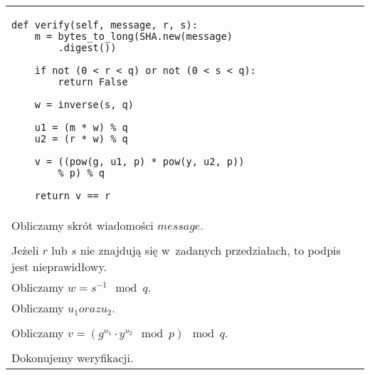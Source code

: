 \documentclass{article}
\begin{document}
        \noindent\begin{table}[ht!]
            \begin{tabular}{lr}
                \begin{minipage}[t]{0.45\textwidth}
                    \begin{verbatim}
def verify(self, message, r, s):
    m = bytes_to_long(SHA.new(message)
        .digest())

    if not (0 < r < q) or not (0 < s < q):
        return False

    w = inverse(s, q)
    
    u1 = (m * w) % q
    u2 = (r * w) % q
    
    v = ((pow(g, u1, p) * pow(y, u2, p)) 
        % p) % q

    return v == r
                    \end{verbatim}
                \end{minipage}
                
                &
        
                \begin{minipage}[t]{0.45\textwidth}                    
                    \noindent \\ Obliczamy skrót wiadomości $message$. \\ \\
                    
                    \noindent Jeżeli $r$ lub $s$ nie znajdują się w~zadanych przedziałach, to podpis jest nieprawidłowy. \\
                    
                    \noindent Obliczamy $w = s^{-1} \mod q$. \\
                    
                    \noindent Obliczamy $u_{1} oraz u_{2}$. \\ \\
                    
                    \noindent Obliczamy $v = (g^{u_{1}} \cdot y^{u_{2}} \mod p) \mod q$. \\ \\
                    
                    \noindent Dokonujemy weryfikacji.
                \end{minipage}
            
                \\
            
            \end{tabular}
        \end{table}
        
\end{document}
